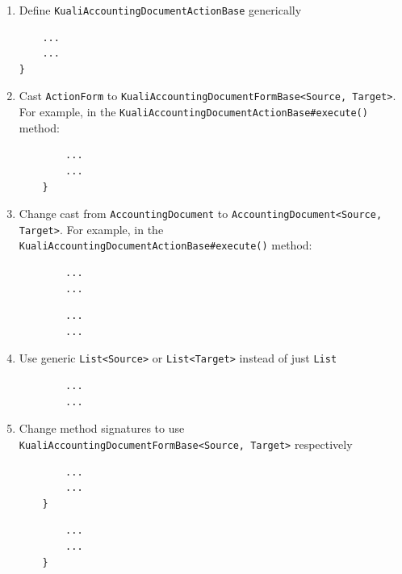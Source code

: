 \documentclass[12pt,notitlepage]{article}
\begin{document}
  \begin{enumerate}
    \item Define \verb|KualiAccountingDocumentActionBase| generically
      
      \begin{lstlisting}
    ...
    ...
}
  \end{lstlisting}

    \item Cast \verb|ActionForm| to \verb|KualiAccountingDocumentFormBase<Source, Target>|. For example, in the \verb|KualiAccountingDocumentActionBase#execute()| method:
      
      \begin{lstlisting}
        ...
        ...
    }
      \end{lstlisting}
    \item Change cast from \verb|AccountingDocument| to \verb|AccountingDocument<Source, Target>|. For example, in the \verb|KualiAccountingDocumentActionBase#execute()| method:
      \begin{lstlisting}
        ...
        ...
      \end{lstlisting}
      
      \begin{lstlisting}
        ...
        ...
      \end{lstlisting}
    \item Use generic \verb|List<Source>| or \verb|List<Target>| instead of just \verb|List|
      
      \begin{lstlisting}
        ...
        ...
      \end{lstlisting}

    \item Change method signatures to use \verb|KualiAccountingDocumentFormBase<Source, Target>| respectively
      
      \begin{lstlisting}
        ...
        ...
    }
      \end{lstlisting}

      
      \begin{lstlisting}
        ...
        ...
    }
      \end{lstlisting}
  \end{enumerate}
\end{document}
